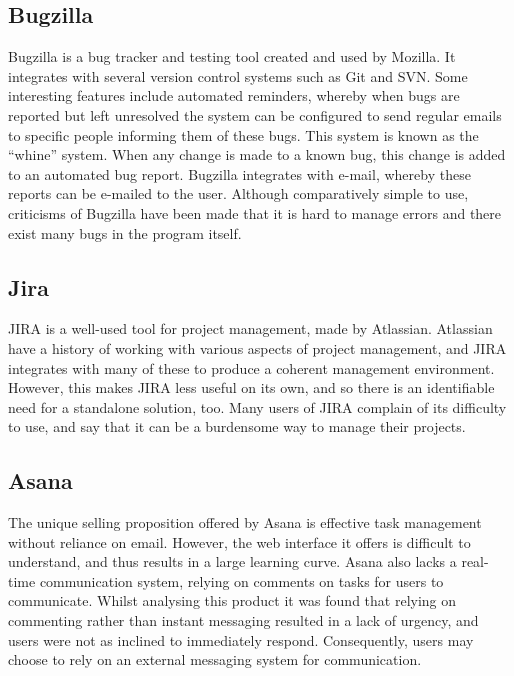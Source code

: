 \documentclass[a4paper]{l3proj}
\begin{document}
\subsection{Bugzilla}
\label{bugzilla}

Bugzilla is a bug tracker and testing tool created and used by Mozilla. It integrates with several version control systems such as Git and SVN.  Some interesting features include automated reminders, whereby when bugs are reported but left unresolved the system can be configured to send regular emails to specific people informing them of these bugs. This system is known as the ``whine'' system.  When any change is made to a known bug, this change is added to an automated bug report.  Bugzilla integrates with e-mail, whereby these reports can be e-mailed to the user. Although comparatively simple to use, criticisms of Bugzilla have been made that it is hard to manage errors and there exist many bugs in the program itself.

\subsection{Jira}
\label{jira}
JIRA \cite{1_atlassian_2015} is a well-used tool for project management, made by Atlassian. Atlassian have a history of working with various aspects of project management, and JIRA integrates with many of these to produce a coherent management environment. However, this makes JIRA less useful on its own, and so there is an identifiable need for a standalone solution, too. Many users of JIRA complain of its difficulty to use, and say that it can be a burdensome way to manage their projects.


\subsection{Asana}
\label{asana}

The unique selling proposition offered by Asana is effective task management without reliance on email. However, the web interface it offers is difficult to understand, and thus results in a large learning curve. Asana also lacks a real-time communication system, relying on comments on tasks for users to communicate. Whilst analysing this product it was found that relying on commenting rather than instant messaging resulted in a lack of urgency, and users were not as inclined to immediately respond. Consequently, users may choose to rely on an external messaging system for communication.
\end{document}

